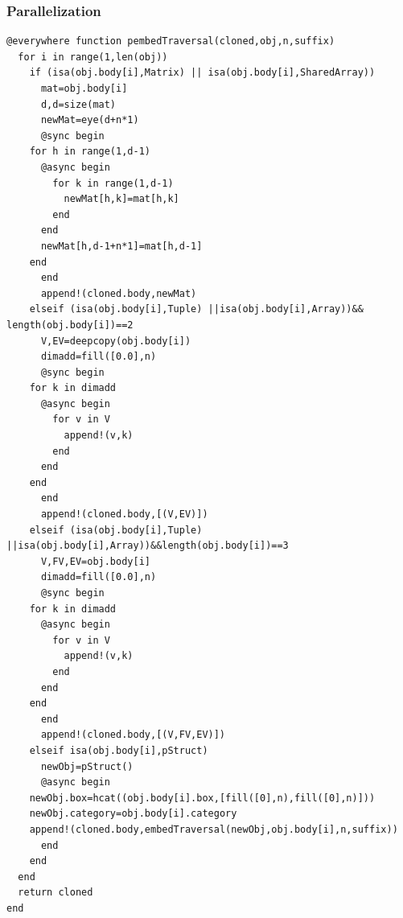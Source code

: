 \documentclass[a4paper,12pt]{article}
\begin{document}
\subsubsection{Parallelization}
\begin{Verbatim}[fontsize=\footnotesize]
@everywhere function pembedTraversal(cloned,obj,n,suffix)
  for i in range(1,len(obj))
    if (isa(obj.body[i],Matrix) || isa(obj.body[i],SharedArray))
      mat=obj.body[i]
      d,d=size(mat)
      newMat=eye(d+n*1)
      @sync begin
	for h in range(1,d-1)
	  @async begin
	    for k in range(1,d-1)
	      newMat[h,k]=mat[h,k]
	    end
	  end
	  newMat[h,d-1+n*1]=mat[h,d-1]
	end
      end
      append!(cloned.body,newMat)
    elseif (isa(obj.body[i],Tuple) ||isa(obj.body[i],Array))&& length(obj.body[i])==2 
      V,EV=deepcopy(obj.body[i])
      dimadd=fill([0.0],n)
      @sync begin
	for k in dimadd
	  @async begin
	    for v in V
	      append!(v,k)
	    end
	  end
	end
      end
      append!(cloned.body,[(V,EV)])
    elseif (isa(obj.body[i],Tuple) ||isa(obj.body[i],Array))&&length(obj.body[i])==3
      V,FV,EV=obj.body[i]
      dimadd=fill([0.0],n)
      @sync begin
	for k in dimadd
	  @async begin
	    for v in V
	      append!(v,k)
	    end
	  end
	end
      end
      append!(cloned.body,[(V,FV,EV)])
    elseif isa(obj.body[i],pStruct)
      newObj=pStruct()
      @async begin
	newObj.box=hcat((obj.body[i].box,[fill([0],n),fill([0],n)]))
	newObj.category=obj.body[i].category
	append!(cloned.body,embedTraversal(newObj,obj.body[i],n,suffix))
      end
    end
  end
  return cloned
end

\end{Verbatim}
\end{document}
